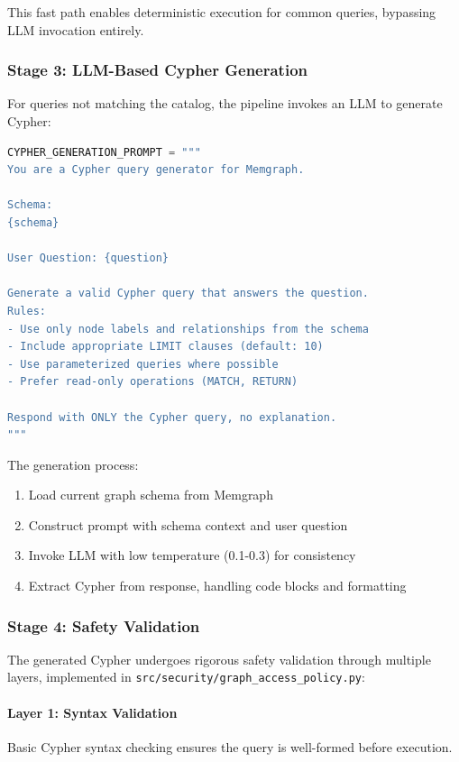 This fast path enables deterministic execution for common queries, bypassing LLM invocation entirely.

\subsubsection{Stage 3: LLM-Based Cypher Generation}

For queries not matching the catalog, the pipeline invokes an LLM to generate Cypher:

\begin{lstlisting}[language=Python, caption={LLM-based Cypher generation prompt}, label=lst:cypher-generation]
CYPHER_GENERATION_PROMPT = """
You are a Cypher query generator for Memgraph.

Schema:
{schema}

User Question: {question}

Generate a valid Cypher query that answers the question.
Rules:
- Use only node labels and relationships from the schema
- Include appropriate LIMIT clauses (default: 10)
- Use parameterized queries where possible
- Prefer read-only operations (MATCH, RETURN)

Respond with ONLY the Cypher query, no explanation.
"""
\end{lstlisting}

The generation process:
\begin{enumerate}
    \item Load current graph schema from Memgraph
    \item Construct prompt with schema context and user question
    \item Invoke LLM with low temperature (0.1-0.3) for consistency
    \item Extract Cypher from response, handling code blocks and formatting
\end{enumerate}

\subsubsection{Stage 4: Safety Validation}

The generated Cypher undergoes rigorous safety validation through multiple layers, implemented in \texttt{src/security/graph\_access\_policy.py}:

\paragraph{Layer 1: Syntax Validation} Basic Cypher syntax checking ensures the query is well-formed before execution.

